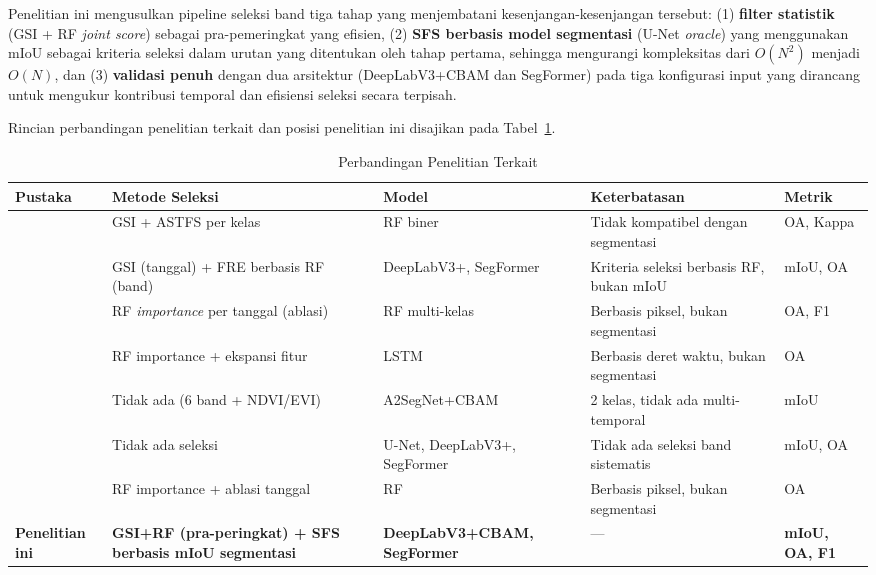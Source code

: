 Penelitian ini mengusulkan pipeline seleksi band tiga tahap yang menjembatani kesenjangan-kesenjangan tersebut: (1) \textbf{filter statistik} (GSI + RF \textit{joint score}) sebagai pra-pemeringkat yang efisien, (2) \textbf{SFS berbasis model segmentasi} (U-Net \textit{oracle}) yang menggunakan mIoU sebagai kriteria seleksi dalam urutan yang ditentukan oleh tahap pertama, sehingga mengurangi kompleksitas dari $O(N^2)$ menjadi $O(N)$, dan (3) \textbf{validasi penuh} dengan dua arsitektur (DeepLabV3+CBAM dan SegFormer) pada tiga konfigurasi input yang dirancang untuk mengukur kontribusi temporal dan efisiensi seleksi secara terpisah.

Rincian perbandingan penelitian terkait dan posisi penelitian ini disajikan pada Tabel~\ref{tab:penelitian_terkait}.

\begin{table}[H]
    \centering
    \caption{Perbandingan Penelitian Terkait}
    \label{tab:penelitian_terkait}
    \footnotesize
    \begin{tabular}{|p{2.2cm}|p{2.8cm}|p{2.8cm}|p{2.8cm}|p{2.2cm}|}
    \hline
    \textbf{Pustaka} & \textbf{Metode Seleksi} & \textbf{Model} & \textbf{Keterbatasan} & \textbf{Metrik} \\ \hline
    \citep{rs12010162} & GSI + ASTFS per kelas & RF biner & Tidak kompatibel dengan segmentasi & OA, Kappa \\ \hline
    \citep{li2023hetao} & GSI (tanggal) + FRE berbasis RF (band) & DeepLabV3+, SegFormer & Kriteria seleksi berbasis RF, bukan mIoU & mIoU, OA \\ \hline
    \citep{yi2020} & RF \textit{importance} per tanggal (ablasi) & RF multi-kelas & Berbasis piksel, bukan segmentasi & OA, F1 \\ \hline
    \citep{rs15215203} & RF importance + ekspansi fitur & LSTM & Berbasis deret waktu, bukan segmentasi & OA \\ \hline
    \citep{gao2023} & Tidak ada (6 band + NDVI/EVI) & A2SegNet+CBAM & 2 kelas, tidak ada multi-temporal & mIoU \\ \hline
    \citep{li2023} & Tidak ada seleksi & U-Net, DeepLabV3+, SegFormer & Tidak ada seleksi band sistematis & mIoU, OA \\ \hline
    \citep{yi2020} & RF importance + ablasi tanggal & RF & Berbasis piksel, bukan segmentasi & OA \\ \hline
    \textbf{Penelitian ini} & \textbf{GSI+RF (pra-peringkat) + SFS berbasis mIoU segmentasi} & \textbf{DeepLabV3+CBAM, SegFormer} & --- & \textbf{mIoU, OA, F1} \\ \hline
    \end{tabular}
\end{table}
